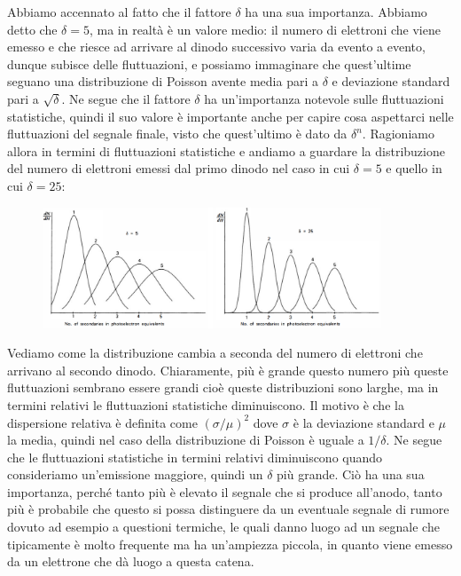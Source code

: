 Abbiamo accennato al fatto che il fattore $\delta$ ha una sua importanza. Abbiamo detto che $\delta=5$, ma in realtà è un valore medio: il numero di elettroni che viene emesso e che riesce ad arrivare al dinodo successivo varia da evento a evento, dunque subisce delle fluttuazioni, e possiamo immaginare che quest'ultime seguano una distribuzione di Poisson avente media pari a $\delta$ e deviazione standard pari a $\sqrt{\delta}$. Ne segue che il fattore $\delta$ ha un'importanza notevole sulle fluttuazioni statistiche, quindi il suo valore è importante anche per capire cosa aspettarci nelle fluttuazioni del segnale finale, visto che quest'ultimo è dato da $\delta^n$. Ragioniamo allora in termini di fluttuazioni statistiche e andiamo a guardare la distribuzione del numero di elettroni emessi dal primo dinodo nel caso in cui $\delta=5$ e quello in cui $\delta=25$:
\begin{figure}[H]
   \centering
   \includegraphics[width=0.9\textwidth]{immagini/distribuzione_elettroni_dinodo_delta.png}
\end{figure}
Vediamo come la distribuzione cambia a seconda del numero di elettroni che arrivano al secondo dinodo. Chiaramente, più è grande questo numero più queste fluttuazioni sembrano essere grandi cioè queste distribuzioni sono larghe, ma in termini relativi le fluttuazioni statistiche diminuiscono. Il motivo è che la dispersione relativa è definita come $(\sigma/\mu)^2$ dove $\sigma$ è la deviazione standard e $\mu$ la media, quindi nel caso della distribuzione di Poisson è uguale a $1/\delta$. Ne segue che le fluttuazioni statistiche in termini relativi diminuiscono quando consideriamo un'emissione maggiore, quindi un $\delta$ più grande. Ciò ha una sua importanza, perché tanto più è elevato il segnale che si produce all'anodo, tanto più è probabile che questo si possa distinguere da un eventuale segnale di rumore dovuto ad esempio a questioni termiche, le quali danno luogo ad un segnale che tipicamente è molto frequente ma ha un'ampiezza piccola, in quanto viene emesso da un elettrone che dà luogo a questa catena. 

